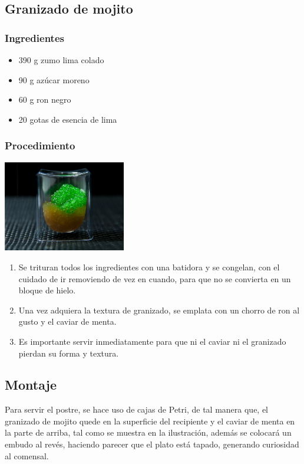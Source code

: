\documentclass{scrartcl}
\begin{document}
		\subsection{Granizado de mojito}
			\subsubsection{Ingredientes}
				\begin{multicols}{2}
					\begin{itemize}
						\item 390 g zumo lima colado 
						\item 90 g azúcar moreno 
						\item 60 g ron negro 
						\item 20 gotas de esencia de lima
					\end{itemize}
				\end{multicols}
			     
			\subsubsection{Procedimiento \cite{maite}}
			\begin{center}
				\includegraphics[width = 0.4\textwidth]{images/caviar4}
			\end{center}
			\begin{enumerate}
				\item Se trituran todos los ingredientes con una batidora y se congelan, con el cuidado de ir removiendo de vez en cuando, para que no se convierta en un bloque de hielo. 
				\item Una vez adquiera la textura de granizado, se emplata con un chorro de ron al gusto y el caviar de menta.   
				\item Es importante servir inmediatamente para que ni el caviar ni el granizado pierdan su forma y textura. 
			\end{enumerate}
		\subsection{Montaje}
			Para servir el postre, se hace uso de cajas de Petri, de tal manera que, el granizado de mojito quede en la superficie del recipiente y el caviar de menta en la parte de arriba, tal como se muestra en la ilustración, además se colocará un embudo al revés, haciendo parecer que el plato está tapado, generando curiosidad al comensal. 
	
	\newpage
	
	
\end{document}
